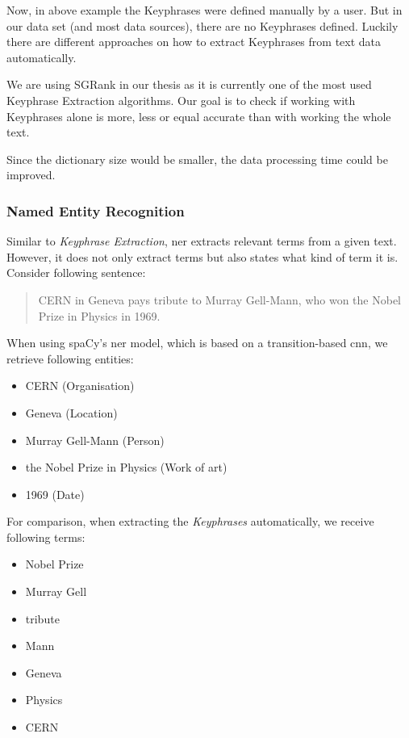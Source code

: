 Now, in above example the Keyphrases were defined manually by a user.
But in our data set (and most data sources), there are no Keyphrases defined.
Luckily there are different approaches on how to extract Keyphrases from text data automatically.

We are using SGRank\cite{SGRank} in our thesis as it is currently one of the most used Keyphrase Extraction algorithms.
Our goal is to check if working with Keyphrases alone is more, less or equal accurate
than with working the whole text.

Since the dictionary size would be smaller, the data processing time could be improved.

\subsubsection{Named Entity Recognition}
\label{subsubsec:3_named_entity_recognition}

Similar to \textit{Keyphrase Extraction}, \Gls{ner} extracts relevant terms from a given text.
However, it does not only extract terms but also states what kind of term it is.
Consider following sentence:

\begin{quote}
    CERN in Geneva pays tribute to Murray Gell-Mann, who won the Nobel Prize in Physics in 1969.
\end{quote}

When using spaCy's \gls{ner} model, which is based on a transition-based \gls{cnn}\cite{LampleBSKD16},
we retrieve following entities:

\begin{itemize}
    \item CERN (Organisation)
    \item Geneva (Location)
    \item Murray Gell-Mann (Person)
    \item the Nobel Prize in Physics (Work of art)
    \item 1969 (Date)
\end{itemize}

For comparison, when extracting the \textit{Keyphrases} automatically, we receive following terms:

\begin{itemize}
    \item Nobel Prize
    \item Murray Gell
    \item tribute
    \item Mann
    \item Geneva
    \item Physics
    \item CERN
\end{itemize}

